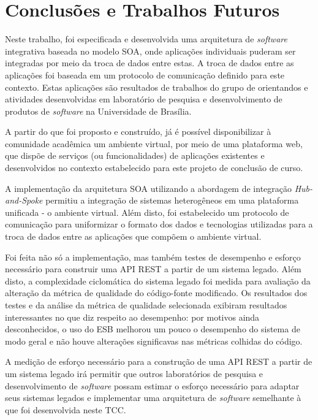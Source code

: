 \chapter[Conclusões e Trabalhos Futuros]{Conclusões e Trabalhos Futuros}

Neste trabalho, foi especificada e desenvolvida uma arquitetura de \textit{software} integrativa baseada no modelo SOA, onde aplicações individuais puderam ser integradas por meio da troca de dados entre estas. A troca de dados entre as aplicações foi baseada em um protocolo de comunicação definido para este contexto. Estas aplicações são resultados de trabalhos do grupo de orientandos e atividades desenvolvidas em laboratório de pesquisa e desenvolvimento de produtos de \textit{software} na Universidade de Brasília.

A partir do que foi proposto e construído, já é possível disponibilizar à comunidade acadêmica um ambiente virtual, por meio de uma plataforma web, que dispõe de serviços (ou funcionalidades) de aplicações existentes e desenvolvidos no contexto estabelecido para este projeto de conclusão de curso.

A implementação da arquitetura SOA utilizando a abordagem de integração \textit{Hub-and-Spoke} permitiu a integração de sistemas heterogêneos em uma plataforma unificada - o ambiente virtual. Além disto, foi estabelecido um protocolo de comunicação para uniformizar o formato dos dados e tecnologias utilizadas para a troca de dados entre as aplicações  que compõem o ambiente virtual.

Foi feita não só a implementação, mas também testes de desempenho e esforço necessário para construir uma API REST a partir de um sistema legado. Além disto, a complexidade ciclomática do sistema legado foi medida para avaliação da alteração da métrica de qualidade do código-fonte modificado. Os resultados dos testes e da análise da métrica de qualidade selecionada exibiram resultados interessantes no que diz respeito ao desempenho: por motivos ainda desconhecidos, o uso do ESB melhorou um pouco o desempenho do sistema de modo geral e não houve alterações significavas nas métricas colhidas do código.

A medição de esforço necessário para a construção de uma API REST a partir de um sistema legado irá permitir que outros laboratórios de pesquisa e desenvolvimento de \textit{software} possam estimar o esforço necessário para adaptar seus sistemas legados e implementar uma arquitetura de \textit{software} semelhante à que foi desenvolvida neste TCC.

